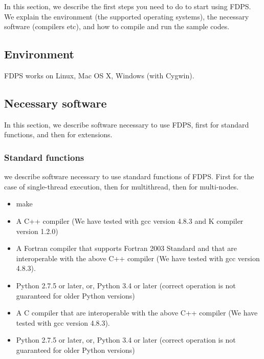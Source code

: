 In this section, we describe the first steps you need to do to start
using FDPS. We explain the environment (the supported operating systems), the necessary software (compilers etc), and how to compile and run the sample codes.

\subsection{Environment}
FDPS works on Linux, Mac OS X, Windows (with Cygwin). 


\subsection{Necessary software}
In this section, we describe software necessary to use FDPS, first for standard functions, and then for extensions. 

\subsubsection{Standard functions}
we describe software necessary to use standard functions of FDPS. First for the case of single-thread execution, then for multithread, then for multi-nodes.

\begin{itemize}
\item make
\item A C++ compiler (We have tested with gcc version 4.8.3 and  K
  compiler version 1.2.0)
\ifFtn %
\item A Fortran compiler that supports Fortran 2003 Standard and that are interoperable with the above C++ compiler (We have tested with gcc version 4.8.3).
\item Python 2.7.5 or later, or, Python 3.4 or later (correct operation is not guaranteed for older Python versions)
\endifFtn
\ifC %
\item A C compiler that are interoperable with the above C++ compiler (We have tested with gcc version 4.8.3).
\item Python 2.7.5 or later, or, Python 3.4 or later (correct operation is not guaranteed for older Python versions)
\endifC
\end{itemize}

